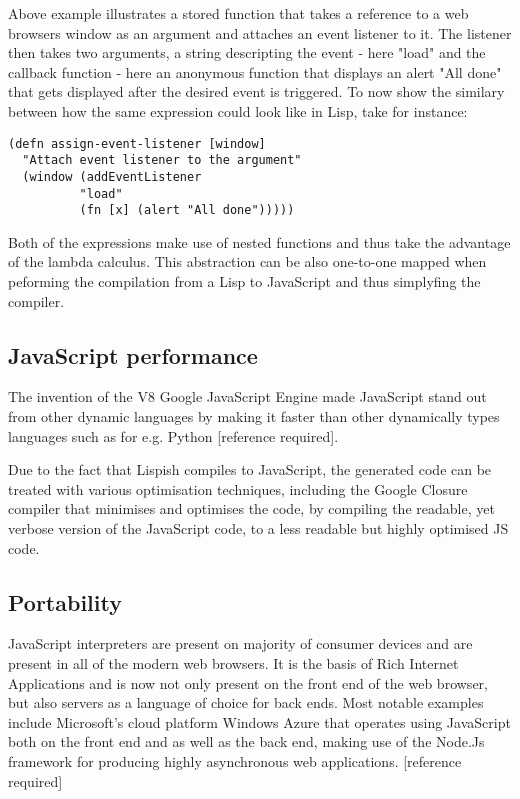Above example illustrates a stored function that takes a reference to a web browsers window as an argument and attaches an event listener to it. The listener then takes two arguments, a string descripting the event - here "load" and the callback function - here an anonymous function that displays an alert "All done" that gets displayed after the desired event is triggered.
To now show the similary between how the same expression could look like in Lisp, take for instance:

\begin{lstlisting}
(defn assign-event-listener [window]
  "Attach event listener to the argument"
  (window (addEventListener 
  	   	  "load" 
		  (fn [x] (alert "All done")))))
\end{lstlisting}

Both of the expressions make use of nested functions and thus take the advantage of the lambda calculus. This abstraction can be also one-to-one mapped when peforming the compilation from a Lisp to JavaScript and thus simplyfing the compiler.

\subsection{JavaScript performance}
The invention of the V8 Google JavaScript Engine made JavaScript stand out from other dynamic languages by making it faster than other dynamically types languages such as for e.g. Python [reference required].

Due to the fact that Lispish compiles to JavaScript, the generated code can be treated with various optimisation techniques, including the Google Closure compiler that minimises and optimises the code, by compiling the readable, yet verbose version of the JavaScript code, to a less readable but highly optimised JS code. 

\subsection{Portability}
JavaScript interpreters are present on majority of consumer devices and are present in all of the modern web browsers. It is the basis of Rich Internet Applications and is now not only present on the front end of the web browser, but also servers as a language of choice for back ends.
Most notable examples include Microsoft's cloud platform Windows Azure that operates using JavaScript both on the front end and as well as the back end, making use of the Node.Js framework for producing highly asynchronous web applications. [reference required]


